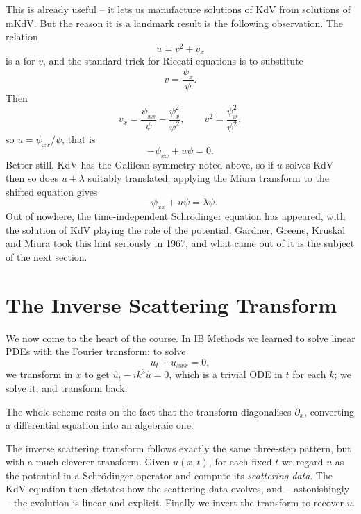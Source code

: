 This is already useful -- it lets us manufacture solutions of KdV from solutions of mKdV. But the reason it is a landmark result is the following observation. The relation
$$
u = v^2 + v_x
$$
is a  for $v$, and the standard trick for Riccati equations is to substitute
$$
v = \frac{\psi_x}{\psi}.
$$
Then
$$
v_x = \frac{\psi_{xx}}{\psi} - \frac{\psi_x^2}{\psi^2}, \qquad v^2 = \frac{\psi_x^2}{\psi^2},
$$
so $u = \psi_{xx}/\psi$, that is
$$
-\psi_{xx} + u\psi = 0.
$$
Better still, KdV has the Galilean symmetry noted above, so if $u$ solves KdV then so does $u + \lambda$ suitably translated; applying the Miura transform to the shifted equation gives
$$
-\psi_{xx} + u\psi = \lambda\psi.
$$
Out of nowhere, the time-independent Schr\"odinger equation has appeared, with the solution of KdV playing the role of the potential. Gardner, Greene, Kruskal and Miura took this hint seriously in 1967, and what came out of it is the subject of the next section.

\section{The Inverse Scattering Transform}

We now come to the heart of the course. In IB Methods we learned to solve linear PDEs with the Fourier transform: to solve
$$
u_t + u_{xxx} = 0,
$$
we transform in $x$ to get $\hat u_t - ik^3\hat u = 0$, which is a trivial ODE in $t$ for each $k$; we solve it, and transform back.
\begin{center}
\end{center}
The whole scheme rests on the fact that the transform diagonalises $\partial_x$, converting a differential equation into an algebraic one.

The inverse scattering transform follows exactly the same three-step pattern, but with a much cleverer transform. Given $u(x,t)$, for each fixed $t$ we regard $u$ as the potential in a Schr\"odinger operator and compute its \emph{scattering data}. The KdV equation then dictates how the scattering data evolves, and -- astonishingly -- the evolution is linear and explicit. Finally we invert the transform to recover $u$.

